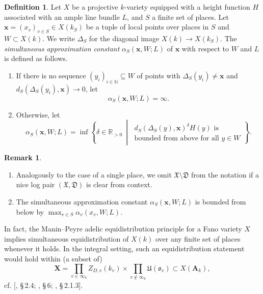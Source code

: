 \documentclass[a4paper, twoside, 11pt]{amsart}
\theoremstyle{definition}
\newtheorem{definition}[theorem]{Definition}
\newtheorem{remark}[theorem]{Remark}
\newcommand{\bx}{{\boldsymbol{x}}}
\newcommand{\RA}{{\mathbf{A}}}
\newcommand{\bX}{{\boldsymbol{X}}}
\newcommand{\mD}{\mathfrak{D}}
\newcommand{\mU}{\mathfrak{U}}
\newcommand{\mX}{\mathfrak{X}}
\newcommand{\fo}{\mathfrak{o}}
\newcommand{\NN}{\mathbb{N}}
\newcommand{\RR}{\mathbb{R}}
\begin{document}
\begin{definition}
	Let $X$ be a projective $k$-variety equipped with a height function $H$ associated with an ample line bundle $L$, and $S$ a finite set of places.
	Let $\bx = (x_v)_{v\in S}\in X(k_S)$ be a tuple of local points over places in $S$ and $W\subset X(k)$. We write $\Delta_S$ for the diagonal image $X(k)\to X(k_S)$. The \emph{simultaneous approximation constant} $\alpha_S(\bx, W; L)$ of $\bx$  with respect to $W$ and $L$ is defined as follows.
	\begin{enumerate}
		\item If there is no sequence $(y_i)_{i\in \NN}\subseteq W$ of points with $\Delta_S(y_i)\neq\bx$ and $d_S(\Delta_S(y_i), \bx)\to 0$, let
		\begin{equation*}
			\alpha_S(\bx, W; L) =\infty.
		\end{equation*}
		\item Otherwise, let
		\begin{equation*}
		\alpha_S(\bx, W; L)  = \inf\left\{
		\delta\in \RR_{>0}
		\ \middle|\  \substack{
			d_S(\Delta_S(y),\bx)^\delta H(y) \text{ is} \\
			\text{bounded from above for all } y\in W
		}
		\right\}.
		\end{equation*}
	\end{enumerate}
\end{definition}
\begin{remark}
	\begin{enumerate}[label = (\arabic*)]
		\item Analogously to the case of a single place, 
        we omit $\mX\setminus \mD$ from the notation if a nice log pair $(\mX, \mD)$ is clear from context.
		\item The simultaneous approximation constant $\alpha_S(\bx,W;L)$ is bounded from below by $\max_{v\in S}\alpha_v(x_v,W;L)$.
	\end{enumerate}
	
\end{remark}

In fact, the Manin--Peyre adelic equidistribution principle \cite[pp.~230--234]{Peyre} for a Fano variety $X$ implies simultaneous equidistribution of $X(k)$ over any finite set of places whenever it holds.
In the integral setting, such an equidistribution statement would hold within (a subset of)
\begin{equation}\label{eq:X}
	\bX = \prod_{v\in \infty_k} Z_{D,v}(k_v) \times \prod_{v\not\in \infty_k} \mU(\fo_v) \subset X(\RA_k),
\end{equation} cf. [, \S\,2.4; , \S\,6; , \S\,2.1.3].
\end{document}
